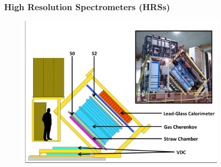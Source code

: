 \documentclass[12pt,usenames,dvipsnames]{beamer}
\begin{document}
\begin{frame}
\frametitle{High Resolution Spectrometers (HRSs)}
	\begin{figure}
		\includegraphics[width=10cm]{../images/HRS_cartoon}
	\end{figure}
\end{frame}
\end{document}
